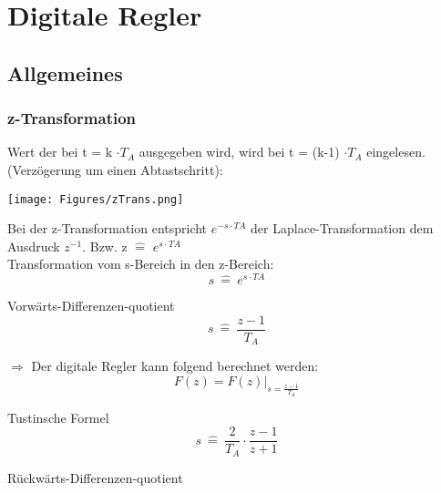 \section{Digitale Regler}
\subsection{Allgemeines}
\subsubsection{z-Transformation}

Wert der bei t = k $\cdot T_A$ ausgegeben wird, wird bei t = (k-1) $\cdot T_A$
eingelesen. (Verzögerung um einen Abtastschritt):

\texttt{[image: Figures/zTrans.png]}

Bei der z-Transformation entspricht $e^{-s \cdot TA}$ der
Laplace-Transformation dem Ausdruck $z^{-1}$. Bzw. z $\hat{=}$ $e^{s \cdot
			TA}$\\ Transformation vom s-Bereich in den z-Bereich:
\[
	s \ \hat{=}\  e^{s \cdot TA}
\]

Vorwärts-Differenzen-quotient
\[
	s \ \hat{=} \ \frac{z-1}{T_A}
\]

$\Rightarrow$ Der digitale Regler kann folgend berechnet werden:
\[
	F(z) = F(z)|_{s= \frac {z-1}{T_A}}
\]

Tustinsche Formel
\[
	s \ \hat{=} \ \frac{2}{T_A} \cdot \frac{z-1}{z+1}
\]

Rückwärts-Differenzen-quotient